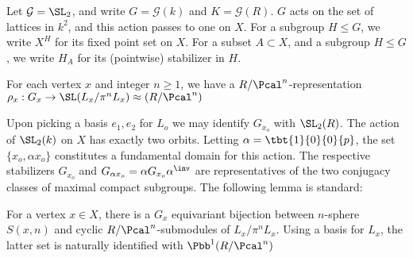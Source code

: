 \documentclass{amsart}
\begin{document}
	Let $\mathcal{G}= \SL_{2}$, and write  $G=\mathcal{G}(k)$  and $K= \mathcal{G}(R)$. $G$ acts on the set of lattices in $k^2$, and this action passes to one on $X$.  For a subgroup $H \leq G$, we write $X^H$ for its fixed point set on $X$. For a subset $A \subset X$,  and a subgroup $H\leq G$, we write $H_A$ for its (pointwise) stabilizer in $H$.
	
	
	For each vertex $x$ and integer $n\geq 1$, we have a $R/\Pcal^{n}$-representation $\rho_{x} : G_{x} \to \SL(L_x / \pi^{n} L_{x}) \approx (R / \Pcal^{n})$
	
	Upon picking a basis $e_{1},e_{2}$ for $L_{o}$ we may identify $G_{x_{o}}$ with $\SL_{2}(R)$. The action of $\SL_{2}(k)$ on $X$ has exactly two orbits. Letting $\alpha = \tbt{1}{0}{0}{p}$, the set $\{x_{o}, \alpha x_{o}\}$ constitutes a fundamental domain for this action. The respective stabilizers $G_{x_{o}}$ and $G_{\alpha x_{o}} = \alpha G_{x_{o}} \alpha^{\inv }$ are representatives of the two conjugacy classes of maximal compact subgroups.
	The following lemma is standard:
	\begin{lemma}\label{lem:nball}
		For a vertex $x \in X$, there is a $G_{x}$ equivariant bijection between $n$-sphere $S(x,n)$ and cyclic $R/\Pcal^{n}$-submodules of $L_{x} / \pi^{n} L_{x}$. Using a basis for $L_{x}$, the latter set is naturally identified with $\Pbb^{1}(R/\Pcal^{n})$
	\end{lemma}
	
\end{document}
